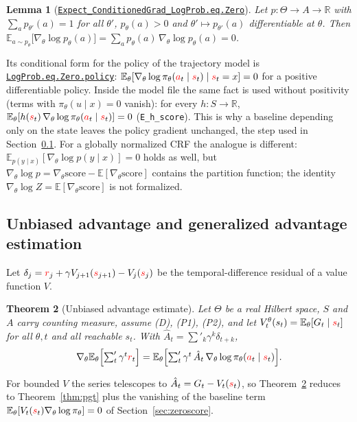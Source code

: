 \documentclass[11pt,a4paper]{article}
\newcommand{\lmod}[2]{\href{http://www.lemma.cn/lean/?module=#2}{\nolinkurl{#1}}}
\newtheorem{theorem}{Theorem}[section]
\newtheorem{lemma}[theorem]{Lemma}
\newcommand{\R}{\mathbb{R}}
\newcommand{\E}{\mathbb{E}}
\newcommand{\rv}[1]{{\color{red}#1}}       %
\newcommand{\sv}{\rv{s}}
\newcommand{\av}{\rv{a}}
\newcommand{\rw}{\rv{r}}
\newcommand{\grad}{\nabla_{\theta}}
\newcommand{\tsum}{\textstyle\sum'}
\begin{document}
\begin{lemma}[\lmod{Expect_ConditionedGrad_LogProb.eq.Zero}{Random.ExpectConditionedGrad_LogProb.eq.Zero}]
\label{lem:zero}
Let $p:\Theta\to A\to\R$ with $\sum_ap_{\theta'}(a)=1$ for all $\theta'$, $p_\theta(a)>0$ and $\theta'\mapsto p_{\theta'}(a)$ differentiable at $\theta$.
Then $\displaystyle\E_{a\sim p_\theta}\bigl[\grad\log p_\theta(a)\bigr]=\sum_ap_\theta(a)\,\grad\log p_\theta(a)=0$.
\end{lemma}
Its conditional form for the policy of the trajectory model is \lmod{LogProb.eq.Zero.policy}{Random.ExpectConditionedGrad_LogProb.eq.Zero#policy}: $\E_\theta[\grad\log\pi_\theta(\av_t\mid\sv_t)\mid\sv_t=x]=0$ for a positive differentiable policy.
Inside the model file the same fact is used without positivity (terms with $\pi_\theta(u\mid x)=0$ vanish): for every $h:S\to\R$, $\E_\theta[h(\sv_t)\,\grad\log\pi_\theta(\av_t\mid\sv_t)]=0$ (\texttt{E\_h\_score}).
This is why a baseline depending only on the state leaves the policy gradient unchanged, the step used in Section~\ref{sec:gae}.
For a globally normalized CRF the analogue is different: $\E_{p(y\mid x)}[\grad\log p(y\mid x)]=0$ holds as well, but $\grad\log p=\grad\mathrm{score}-\E[\grad\mathrm{score}]$ contains the partition function; the identity $\grad\log Z=\E[\grad\mathrm{score}]$ is not formalized.


\subsection{Unbiased advantage and generalized advantage estimation}
\label{sec:gae}

Let $\delta_j=\rw_j+\gamma V_{j+1}(\sv_{j+1})-V_j(\sv_j)$ be the temporal-difference residual of a value function $V$.

\begin{theorem}[Unbiased advantage estimate]
\label{thm:main}
Let $\Theta$ be a real Hilbert space, $S$ and $A$ carry counting measure, assume (D), (P1), (P2), and let $V^\theta_t(s_t)=\E_\theta[G_t\mid\sv_t]$ for all $\theta,t$ and all reachable $s_t$.
With $\hat A_t=\tsum_k\gamma^k\delta_{t+k}$,
\[
\grad\E_\theta\Bigl[\tsum_t\gamma^t\rw_t\Bigr]=\E_\theta\Bigl[\tsum_t\gamma^t\,\hat A_t\,\grad\log\pi_\theta(\av_t\mid\sv_t)\Bigr].
\]
\end{theorem}
For bounded $V$ the series telescopes to $\hat A_t=G_t-V_t(\sv_t)$, so Theorem~\ref{thm:main} reduces to Theorem~\ref{thm:pgt} plus the vanishing of the baseline term $\E_\theta[V_t(\sv_t)\grad\log\pi_\theta]=0$ of Section~\ref{sec:zeroscore}.
\end{document}
